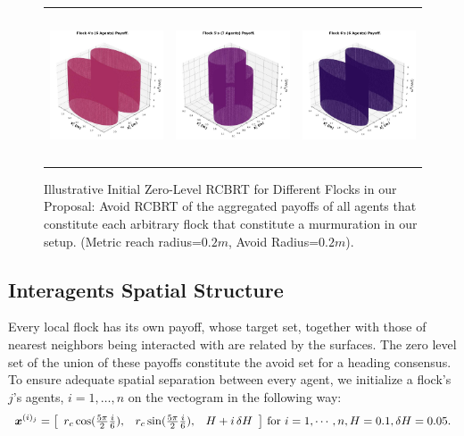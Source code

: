 \begin{figure}[tb!]
\begin{tabular}{ccc}
		\includegraphics[height=12em,width=10em]{figures/flock_4.jpg}
		&
		\includegraphics[height=12em,width=10em]{figures/flock_5.jpg} 
		&
		\includegraphics[height=12em,width=10em]{figures/flock_6.jpg}
	\end{tabular}
	\caption{\footnotesize Illustrative Initial Zero-Level RCBRT for Different Flocks in our Proposal: Avoid RCBRT of the aggregated payoffs of all  agents that constitute each arbitrary flock that constitute a murmuration in our setup.  (Metric reach radius=$0.2m$, Avoid Radius=$0.2m$).} 
	\label{fig:flocks_multi}
\end{figure}

\subsection{Interagents Spatial Structure}

Every local flock has its own payoff, whose target set, together with those of nearest neighbors being interacted with are related by the surfaces. The zero level set of the union of these payoffs constitute the avoid set for a heading consensus. To ensure adequate spatial separation between every agent, we initialize a flock's $j$'s agents, $i=1,\ldots, n$ on the vectogram in the following way:
%
\begin{align}
	\bm{x}^{(i)_j} = \left[\begin{array}{ccc}
		r_c \cos (\frac{5\pi}{2}\frac{i}{6}), & 	r_c \sin (\frac{5\pi}{2}\frac{i}{6}), & H+i\,\delta H
	\end{array}\right] \, \text{for } i=1, \cdots, n, H=0.1, \delta H = 0.05.
\end{align}
